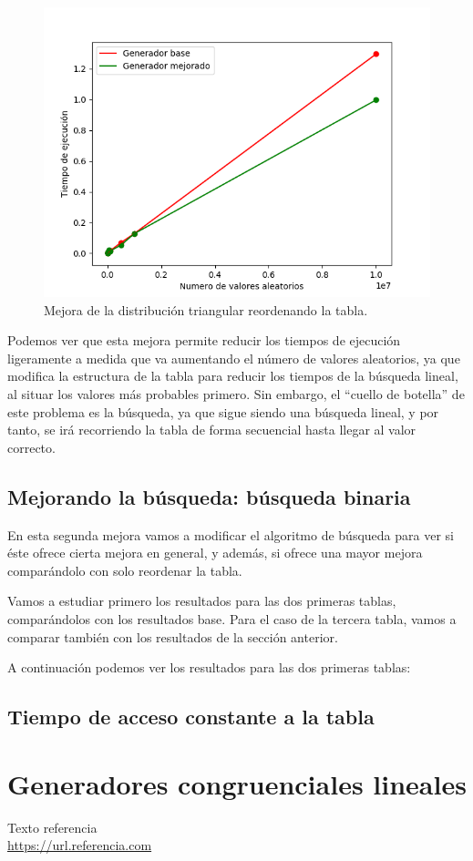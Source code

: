 \documentclass[11pt,a4paper]{report}
\begin{document}
\begin{figure}[H]
\centering
\includegraphics[scale=0.6]{img/mejora1.png}
\caption{Mejora de la distribución triangular reordenando la tabla.}
\label{fig:mejora1}
\end{figure}

Podemos ver que esta mejora permite reducir los tiempos de ejecución ligeramente a medida que va aumentando el número
de valores aleatorios, ya que modifica la estructura de la tabla para reducir los tiempos de la búsqueda lineal, al situar
los valores más probables primero. Sin embargo, el ``cuello de botella'' de este problema es la búsqueda, ya que sigue siendo
una búsqueda lineal, y por tanto, se irá recorriendo la tabla de forma secuencial hasta llegar al valor correcto.

\subsection{Mejorando la búsqueda: búsqueda binaria}

En esta segunda mejora vamos a modificar el algoritmo de búsqueda para ver si éste ofrece cierta mejora en general, y además,
si ofrece una mayor mejora comparándolo con solo reordenar la tabla.

Vamos a estudiar primero los resultados para las dos primeras tablas, comparándolos con los resultados base. Para el caso
de la tercera tabla, vamos a comparar también con los resultados de la sección anterior.

A continuación podemos ver los resultados para las dos primeras tablas:



\subsection{Tiempo de acceso constante a la tabla}

\section{Generadores congruenciales lineales}

\newpage

\begin{thebibliography}{5}

Texto referencia
\\\url{https://url.referencia.com}

\end{thebibliography}
\end{document}
